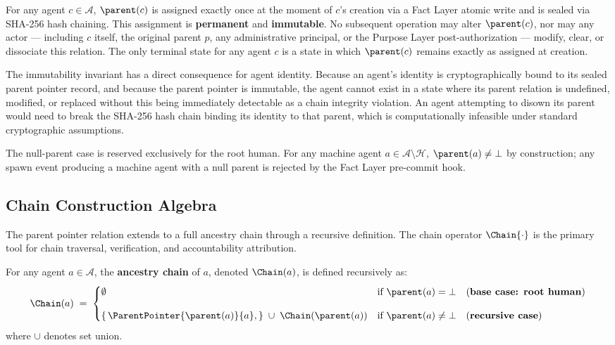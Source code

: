 \begin{invariant}
\label{inv:pp_immutability}
For any agent $c \in \mathcal{A}$, $\parent(c)$ is assigned exactly once at the moment of $c$'s creation via a Fact Layer atomic write and is sealed via SHA-256 hash chaining. This assignment is \textbf{permanent} and \textbf{immutable}. No subsequent operation may alter $\parent(c)$, nor may any actor — including $c$ itself, the original parent $p$, any administrative principal, or the Purpose Layer post-authorization — modify, clear, or dissociate this relation. The only terminal state for any agent $c$ is a state in which $\parent(c)$ remains exactly as assigned at creation.
\end{invariant}

The immutability invariant has a direct consequence for agent identity. Because an agent's identity is cryptographically bound to its sealed parent pointer record, and because the parent pointer is immutable, the agent cannot exist in a state where its parent relation is undefined, modified, or replaced without this being immediately detectable as a chain integrity violation. An agent attempting to disown its parent would need to break the SHA-256 hash chain binding its identity to that parent, which is computationally infeasible under standard cryptographic assumptions.

The null-parent case is reserved exclusively for the root human. For any machine agent $a \in \mathcal{A} \setminus \mathcal{H}$, $\parent(a) \neq \bot$ by construction; any spawn event producing a machine agent with a null parent is rejected by the Fact Layer pre-commit hook.

\subsection{Chain Construction Algebra}
\label{sec:chain_construction}

The parent pointer relation extends to a full ancestry chain through a recursive definition. The chain operator $\Chain{\cdot}$ is the primary tool for chain traversal, verification, and accountability attribution.

\begin{definition}
\label{def:chain}
For any agent $a \in \mathcal{A}$, the \textbf{ancestry chain} of $a$, denoted $\Chain(a)$, is defined recursively as:
\begin{equation}
\Chain(a) \;=\;
\begin{cases}
\emptyset & \text{if } \parent(a) = \bot \quad \text{(\textbf{base case: root human})} \\[10pt]
\{\,\ParentPointer{\parent(a)}{a},\} \; \cup\; \Chain(\parent(a)) & \text{if } \parent(a) \neq \bot \quad \text{(\textbf{recursive case})}
\end{cases}
\label{eq:chain_recursive}
\end{equation}
where $\cup$ denotes set union.
\end{definition}

